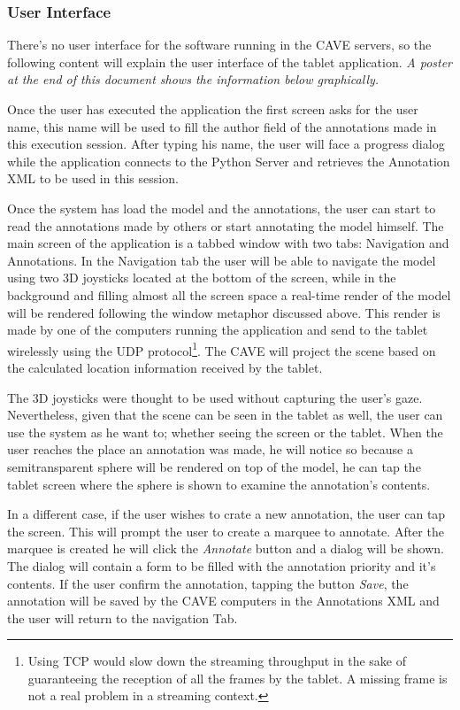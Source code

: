 \subsubsection{User Interface}

There's no user interface for the software running in the CAVE servers, so the following content will explain the user interface of the tablet application. \emph{A poster at the end of this document shows the information below graphically.}

Once the user has executed the application the first screen asks for the user name, this name will be used to fill the author field of the annotations made in this execution session. After typing his name, the user will face a progress dialog while the application connects to the Python Server and retrieves the Annotation XML to be used in this session.

Once the system has load the model and the annotations, the user can start to read the annotations made by others or start annotating the model himself. The main screen of the application is a tabbed window with two tabs: Navigation and Annotations. In the Navigation tab the user will be able to navigate the model using two 3D joysticks located at the bottom of the screen, while in the background and filling almost all the screen space a real-time render of the model will be rendered following the window metaphor discussed above. This render is made by one of the computers running the application and send to the tablet wirelessly using the UDP protocol\footnote{Using TCP would slow down the streaming throughput in the sake of guaranteeing the reception of all the frames by the tablet. A missing frame is not a real problem in a streaming context.}. The CAVE will project the scene based on the calculated location information received by the tablet.

The 3D joysticks were thought to be used without capturing the user's gaze. Nevertheless, given that the scene can be seen in the tablet as well, the user can use the system as he want to; whether seeing the screen or the tablet. When the user reaches the place an annotation was made, he will notice so because a semitransparent sphere will be rendered on top of the model, he can tap the tablet screen where the sphere is shown to examine the annotation's contents. 

In a different case, if the user wishes to crate a new annotation, the user can tap the screen. This will prompt the user to create a marquee to annotate. After the marquee is created he will click the \emph{Annotate} button and a dialog will be shown. The dialog will contain a form to be filled with the annotation priority and it's contents. If the user confirm the annotation, tapping the button \emph{Save}, the annotation will be saved by the CAVE computers in the Annotations XML and the user will return to the navigation Tab. 

